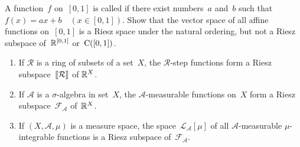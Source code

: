 \documentclass[main.tex]{subfiles}
\begin{document}
%
%
\begin{psec}[Exercise]
\label{1.7}
A function~$f$ on~$[0,1]$ is called 
if there exist numbers~$a$ and~$b$ 
such that~$f(x)=ax+b\quad (x\in[0,1])$.
Show that the vector space of all affine functions on~$[0,1]$
is a Riesz space under the natural ordering,
but not a Riesz subspace of~$\mathbb{R}^{[0,1]}$ or~$\mathrm{C}([0,1])$.
\end{psec}
%
%
\begin{psec}[``1.5 continued'']
\label{1.5_3}
\begin{enumerate}
\item
\label{1.5-7}
If $\mathcal{R}$ is a ring of subsets of a set~$X$,
the $\mathcal{R}$-step functions form a 
Riesz subspace~$\lbb \mathcal{R} \rbb$ of $\mathbb{R}^X$.
%
\item
\label{1.5-8}
If $\mathcal{A}$ is a $\sigma$-algebra 
in set~$X$,
the $\mathcal A$-measurable functions on~$X$
form a Riesz subspace~$\mathcal F_{\mathcal A}$ of~$\mathbb{R}^X$.
%
\item
\label{1.5-9}
If $(X,\mathcal A,\mu)$ is a measure space,
the space~$\mathcal L_{\mathcal A}[\mu]$
of all $\mathcal A$-measurable 
$\mu$-integrable functions is a Riesz subspace
of~$\mathcal F_{\mathcal A}$.
\end{enumerate}
\end{psec}
\end{document}
